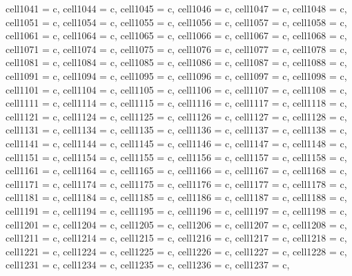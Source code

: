 \begin{longtblr}[
  label = none,
  entry = none,
]
{  cell{104}{1} = {c},
  cell{104}{4} = {c},
  cell{104}{5} = {c},
  cell{104}{6} = {c},
  cell{104}{7} = {c},
  cell{104}{8} = {c},
  cell{105}{1} = {c},
  cell{105}{4} = {c},
  cell{105}{5} = {c},
  cell{105}{6} = {c},
  cell{105}{7} = {c},
  cell{105}{8} = {c},
  cell{106}{1} = {c},
  cell{106}{4} = {c},
  cell{106}{5} = {c},
  cell{106}{6} = {c},
  cell{106}{7} = {c},
  cell{106}{8} = {c},
  cell{107}{1} = {c},
  cell{107}{4} = {c},
  cell{107}{5} = {c},
  cell{107}{6} = {c},
  cell{107}{7} = {c},
  cell{107}{8} = {c},
  cell{108}{1} = {c},
  cell{108}{4} = {c},
  cell{108}{5} = {c},
  cell{108}{6} = {c},
  cell{108}{7} = {c},
  cell{108}{8} = {c},
  cell{109}{1} = {c},
  cell{109}{4} = {c},
  cell{109}{5} = {c},
  cell{109}{6} = {c},
  cell{109}{7} = {c},
  cell{109}{8} = {c},
  cell{110}{1} = {c},
  cell{110}{4} = {c},
  cell{110}{5} = {c},
  cell{110}{6} = {c},
  cell{110}{7} = {c},
  cell{110}{8} = {c},
  cell{111}{1} = {c},
  cell{111}{4} = {c},
  cell{111}{5} = {c},
  cell{111}{6} = {c},
  cell{111}{7} = {c},
  cell{111}{8} = {c},
  cell{112}{1} = {c},
  cell{112}{4} = {c},
  cell{112}{5} = {c},
  cell{112}{6} = {c},
  cell{112}{7} = {c},
  cell{112}{8} = {c},
  cell{113}{1} = {c},
  cell{113}{4} = {c},
  cell{113}{5} = {c},
  cell{113}{6} = {c},
  cell{113}{7} = {c},
  cell{113}{8} = {c},
  cell{114}{1} = {c},
  cell{114}{4} = {c},
  cell{114}{5} = {c},
  cell{114}{6} = {c},
  cell{114}{7} = {c},
  cell{114}{8} = {c},
  cell{115}{1} = {c},
  cell{115}{4} = {c},
  cell{115}{5} = {c},
  cell{115}{6} = {c},
  cell{115}{7} = {c},
  cell{115}{8} = {c},
  cell{116}{1} = {c},
  cell{116}{4} = {c},
  cell{116}{5} = {c},
  cell{116}{6} = {c},
  cell{116}{7} = {c},
  cell{116}{8} = {c},
  cell{117}{1} = {c},
  cell{117}{4} = {c},
  cell{117}{5} = {c},
  cell{117}{6} = {c},
  cell{117}{7} = {c},
  cell{117}{8} = {c},
  cell{118}{1} = {c},
  cell{118}{4} = {c},
  cell{118}{5} = {c},
  cell{118}{6} = {c},
  cell{118}{7} = {c},
  cell{118}{8} = {c},
  cell{119}{1} = {c},
  cell{119}{4} = {c},
  cell{119}{5} = {c},
  cell{119}{6} = {c},
  cell{119}{7} = {c},
  cell{119}{8} = {c},
  cell{120}{1} = {c},
  cell{120}{4} = {c},
  cell{120}{5} = {c},
  cell{120}{6} = {c},
  cell{120}{7} = {c},
  cell{120}{8} = {c},
  cell{121}{1} = {c},
  cell{121}{4} = {c},
  cell{121}{5} = {c},
  cell{121}{6} = {c},
  cell{121}{7} = {c},
  cell{121}{8} = {c},
  cell{122}{1} = {c},
  cell{122}{4} = {c},
  cell{122}{5} = {c},
  cell{122}{6} = {c},
  cell{122}{7} = {c},
  cell{122}{8} = {c},
  cell{123}{1} = {c},
  cell{123}{4} = {c},
  cell{123}{5} = {c},
  cell{123}{6} = {c},
  cell{123}{7} = {c},
}
\end{longtblr}
